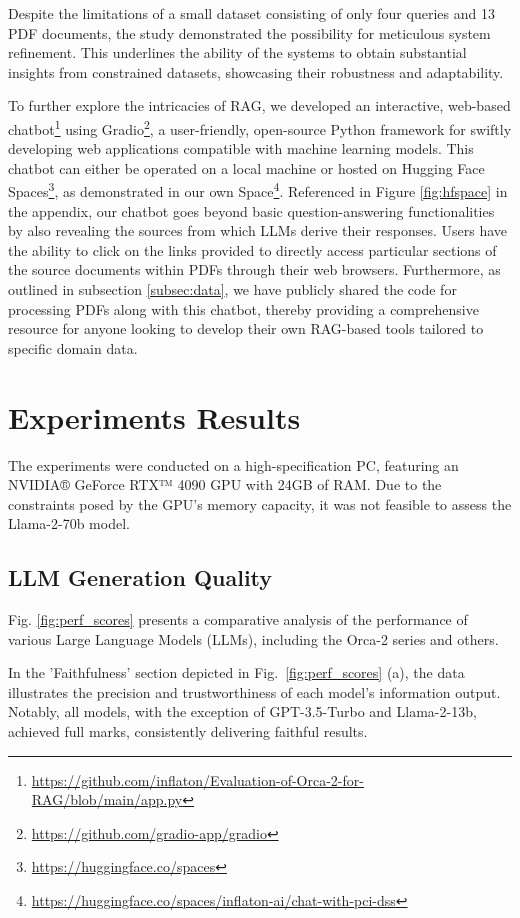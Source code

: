 \documentclass[runningheads]{llncs}
\begin{document}
Despite the limitations of a small dataset consisting of only four queries and 13 PDF documents, the study demonstrated the possibility for meticulous system refinement. This underlines the ability of the systems to obtain substantial insights from constrained datasets, showcasing their robustness and adaptability.

To further explore the intricacies of RAG, we developed an interactive, web-based chatbot\footnote{\url{https://github.com/inflaton/Evaluation-of-Orca-2-for-RAG/blob/main/app.py}} using Gradio\footnote{\url{https://github.com/gradio-app/gradio}}, a user-friendly, open-source Python framework for swiftly developing web applications compatible with machine learning models. This chatbot can either be operated on a local machine or hosted on Hugging Face Spaces\footnote{\url{https://huggingface.co/spaces}}, as demonstrated in our own Space\footnote{\url{https://huggingface.co/spaces/inflaton-ai/chat-with-pci-dss}}. Referenced in Figure \ref{fig:hfspace} in the appendix, our chatbot goes beyond basic question-answering functionalities by also revealing the sources from which LLMs derive their responses. Users have the ability to click on the links provided to directly access particular sections of the source documents within PDFs through their web browsers. Furthermore, as outlined in subsection \ref{subsec:data}, we have publicly shared the code for processing PDFs along with this chatbot, thereby providing a comprehensive resource for anyone looking to develop their own RAG-based tools tailored to specific domain data.

\section{Experiments Results}
\label{sec:Results}

The experiments were conducted on a high-specification PC, featuring an NVIDIA® GeForce RTX™ 4090 GPU with 24GB of RAM. Due to the constraints posed by the GPU's memory capacity, it was not feasible to assess the Llama-2-70b model.

\subsection{LLM Generation Quality}
Fig. \ref{fig:perf_scores} presents a comparative analysis of the performance of various Large Language Models (LLMs), including the Orca-2 series and others.

In the 'Faithfulness' section depicted in Fig.~\ref{fig:perf_scores} (a), the data illustrates the precision and trustworthiness of each model's information output. Notably, all models, with the exception of GPT-3.5-Turbo and Llama-2-13b, achieved full marks, consistently delivering faithful results.
\end{document}
